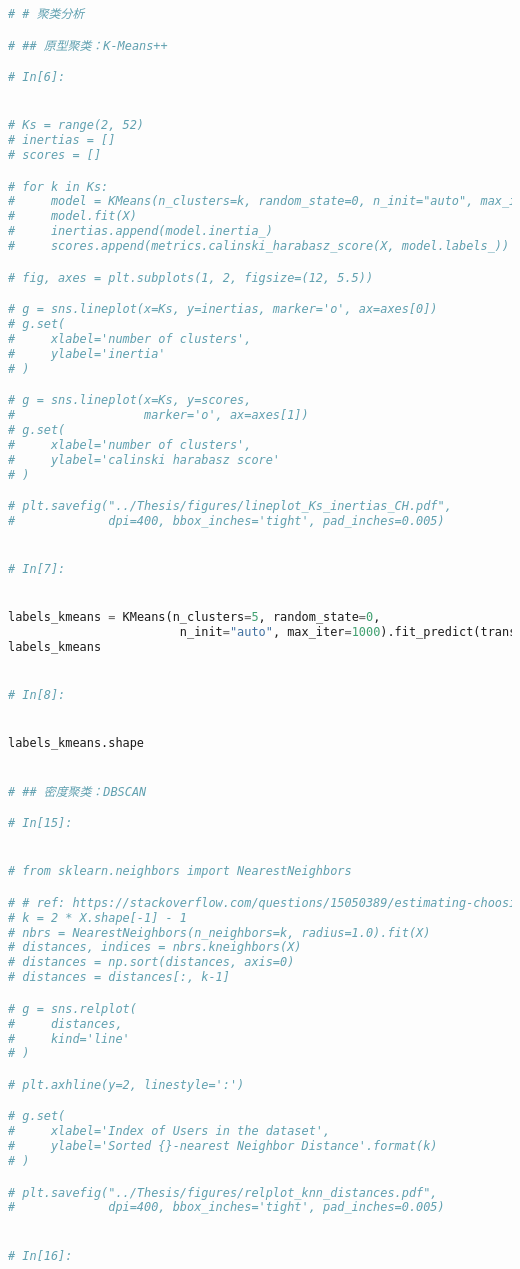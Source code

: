 \documentclass[withoutpreface,bwprint]{cumcmthesis}
\begin{document}
\begin{appendices}
\begin{lstlisting}[language=Python]
# # 聚类分析

# ## 原型聚类：K-Means++

# In[6]:


# Ks = range(2, 52)
# inertias = []
# scores = []

# for k in Ks:
#     model = KMeans(n_clusters=k, random_state=0, n_init="auto", max_iter=1000)
#     model.fit(X)
#     inertias.append(model.inertia_)
#     scores.append(metrics.calinski_harabasz_score(X, model.labels_))

# fig, axes = plt.subplots(1, 2, figsize=(12, 5.5))

# g = sns.lineplot(x=Ks, y=inertias, marker='o', ax=axes[0])
# g.set(
#     xlabel='number of clusters',
#     ylabel='inertia'
# )

# g = sns.lineplot(x=Ks, y=scores,
#                  marker='o', ax=axes[1])
# g.set(
#     xlabel='number of clusters',
#     ylabel='calinski harabasz score'
# )

# plt.savefig("../Thesis/figures/lineplot_Ks_inertias_CH.pdf",
#             dpi=400, bbox_inches='tight', pad_inches=0.005)


# In[7]:


labels_kmeans = KMeans(n_clusters=5, random_state=0,
                        n_init="auto", max_iter=1000).fit_predict(transformed)
labels_kmeans


# In[8]:


labels_kmeans.shape


# ## 密度聚类：DBSCAN

# In[15]:


# from sklearn.neighbors import NearestNeighbors

# # ref: https://stackoverflow.com/questions/15050389/estimating-choosing-optimal-hyperparameters-for-dbscan
# k = 2 * X.shape[-1] - 1
# nbrs = NearestNeighbors(n_neighbors=k, radius=1.0).fit(X)
# distances, indices = nbrs.kneighbors(X)
# distances = np.sort(distances, axis=0)
# distances = distances[:, k-1]

# g = sns.relplot(
#     distances,
#     kind='line'
# )

# plt.axhline(y=2, linestyle=':')

# g.set(
#     xlabel='Index of Users in the dataset',
#     ylabel='Sorted {}-nearest Neighbor Distance'.format(k)
# )

# plt.savefig("../Thesis/figures/relplot_knn_distances.pdf",
#             dpi=400, bbox_inches='tight', pad_inches=0.005)


# In[16]:



\end{lstlisting}
\end{appendices}
\end{document}
